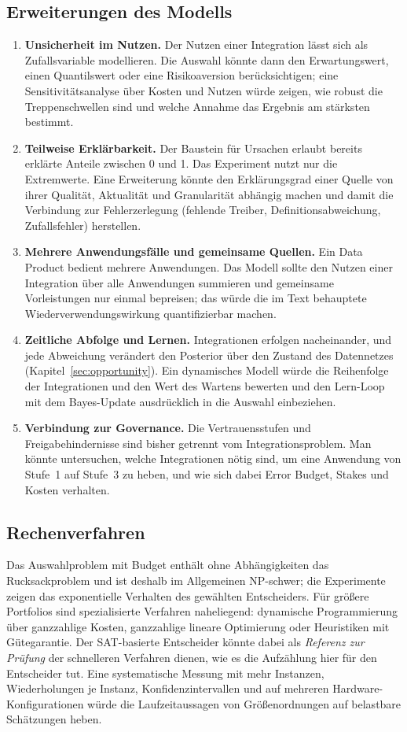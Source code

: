 \documentclass[a4paper,12pt,twoside]{report}
\theoremstyle{definition}
\begin{document}
\subsection{Erweiterungen des Modells}
\begin{enumerate}
\item \textbf{Unsicherheit im Nutzen.} Der Nutzen einer Integration lässt sich als Zufallsvariable modellieren. Die Auswahl könnte dann den Erwartungswert, einen Quantilswert oder eine Risikoaversion berücksichtigen; eine Sensitivitätsanalyse über Kosten und Nutzen würde zeigen, wie robust die Treppenschwellen sind und welche Annahme das Ergebnis am stärksten bestimmt.
\item \textbf{Teilweise Erklärbarkeit.} Der Baustein für Ursachen erlaubt bereits erklärte Anteile zwischen 0 und 1. Das Experiment nutzt nur die Extremwerte. Eine Erweiterung könnte den Erklärungsgrad einer Quelle von ihrer Qualität, Aktualität und Granularität abhängig machen und damit die Verbindung zur Fehlerzerlegung (fehlende Treiber, Definitionsabweichung, Zufallsfehler) herstellen.
\item \textbf{Mehrere Anwendungsfälle und gemeinsame Quellen.} Ein Data Product bedient mehrere Anwendungen. Das Modell sollte den Nutzen einer Integration über alle Anwendungen summieren und gemeinsame Vorleistungen nur einmal bepreisen; das würde die im Text behauptete Wiederverwendungswirkung quantifizierbar machen.
\item \textbf{Zeitliche Abfolge und Lernen.} Integrationen erfolgen nacheinander, und jede Abweichung verändert den Posterior über den Zustand des Datennetzes (Kapitel~\ref{sec:opportunity}). Ein dynamisches Modell würde die Reihenfolge der Integrationen und den Wert des Wartens bewerten und den Lern-Loop mit dem Bayes-Update ausdrücklich in die Auswahl einbeziehen.
\item \textbf{Verbindung zur Governance.} Die Vertrauensstufen und Freigabehindernisse sind bisher getrennt vom Integrationsproblem. Man könnte untersuchen, welche Integrationen nötig sind, um eine Anwendung von Stufe~1 auf Stufe~3 zu heben, und wie sich dabei Error Budget, Stakes und Kosten verhalten.
\end{enumerate}

\subsection{Rechenverfahren}
Das Auswahlproblem mit Budget enthält ohne Abhängigkeiten das Rucksackproblem und ist deshalb im Allgemeinen NP-schwer; die Experimente zeigen das exponentielle Verhalten des gewählten Entscheiders. Für größere Portfolios sind spezialisierte Verfahren naheliegend: dynamische Programmierung über ganzzahlige Kosten, ganzzahlige lineare Optimierung oder Heuristiken mit Gütegarantie. Der SAT-basierte Entscheider könnte dabei als \emph{Referenz zur Prüfung} der schnelleren Verfahren dienen, wie es die Aufzählung hier für den Entscheider tut. Eine systematische Messung mit mehr Instanzen, Wiederholungen je Instanz, Konfidenzintervallen und auf mehreren Hardware-Konfigurationen würde die Laufzeitaussagen von Größenordnungen auf belastbare Schätzungen heben.
\end{document}
